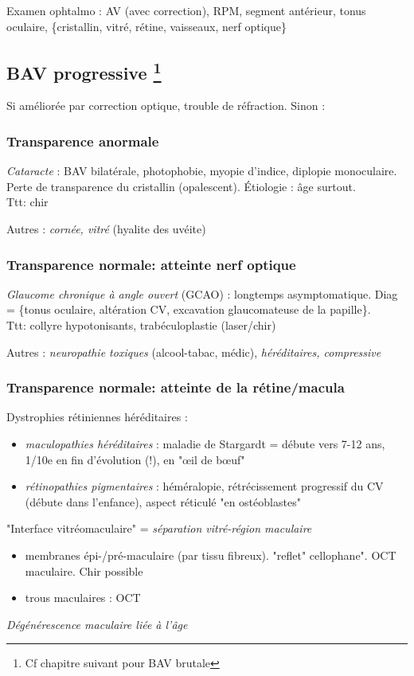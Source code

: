 \documentclass[11pt]{article}
\def\ttt{\hspace*{1cm}Ttt: }
\begin{document}
Examen ophtalmo : AV (avec correction), RPM, segment antérieur, tonus oculaire,
\{cristallin, vitré, rétine, vaisseaux, nerf optique\}

\subsection{BAV progressive \footnote{Cf chapitre suivant pour BAV brutale}}
\label{sec:org5e47ad6}
Si améliorée par correction optique, trouble de réfraction. Sinon :

\subsubsection{Transparence anormale}
\label{sec:org1144803}
\emph{Cataracte} : BAV bilatérale, photophobie, myopie d'indice, diplopie
monoculaire. Perte de transparence du cristallin (opalescent). Étiologie : âge
surtout.\\
\ttt chir

Autres : \emph{cornée, vitré} (hyalite des uvéite)

\subsubsection{Transparence normale: atteinte nerf optique}
\label{sec:orge683d03}
\emph{Glaucome chronique à angle ouvert} (GCAO) : longtemps asymptomatique. Diag =
\{\inc tonus oculaire, altération CV, excavation glaucomateuse de la
papille\}. \\
\ttt collyre hypotonisants, trabéculoplastie (laser/chir)

Autres : \emph{neuropathie toxiques} (alcool-tabac, médic), \emph{héréditaires, compressive}

\subsubsection{Transparence normale: atteinte de la rétine/macula}
\label{sec:orgb2f4b7d}
Dystrophies rétiniennes héréditaires :
\begin{itemize}
\item \emph{maculopathies héréditaires} : maladie de Stargardt = débute vers 7-12 ans,
1/10e en fin d'évolution (!), en "\oe{}il de b\oe{}uf"
\item \emph{rétinopathies pigmentaires} : héméralopie, rétrécissement progressif du CV
(débute dans l'enfance), aspect réticulé "en ostéoblastes"
\end{itemize}
"Interface vitréomaculaire" = \emph{séparation vitré-région maculaire}
\begin{itemize}
\item membranes épi-/pré-maculaire (par tissu fibreux). "reflet" cellophane". OCT
maculaire. Chir possible
\item trous maculaires : OCT
\end{itemize}
\emph{Dégénérescence maculaire liée à l'âge}
\end{document}
